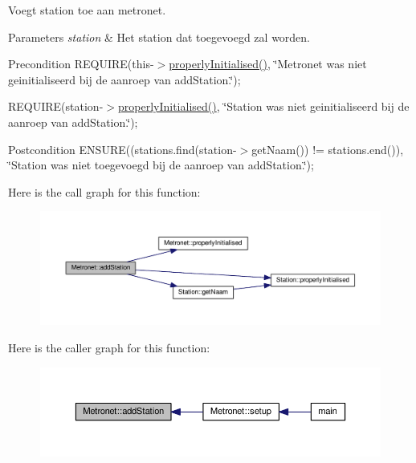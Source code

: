 Voegt station toe aan metronet. 


\begin{DoxyParams}{Parameters}
{\em station} & Het station dat toegevoegd zal worden. \\
\hline
\end{DoxyParams}
\begin{DoxyPrecond}{Precondition}
R\+E\+Q\+U\+I\+RE(this-\/$>$\hyperlink{class_metronet_a3d2adce29a947f162924279b766de645}{properly\+Initialised()}, \char`\"{}\+Metronet was niet geinitialiseerd bij de aanroep van add\+Station.\char`\"{}); 

R\+E\+Q\+U\+I\+RE(station-\/$>$\hyperlink{class_metronet_a3d2adce29a947f162924279b766de645}{properly\+Initialised()}, \char`\"{}\+Station was niet geinitialiseerd bij de aanroep van add\+Station.\char`\"{}); 
\end{DoxyPrecond}
\begin{DoxyPostcond}{Postcondition}
E\+N\+S\+U\+RE((stations.\+find(station-\/$>$get\+Naam()) != stations.\+end()), \char`\"{}\+Station was niet toegevoegd bij de aanroep van add\+Station.\char`\"{}); 
\end{DoxyPostcond}
Here is the call graph for this function\+:\nopagebreak
\begin{figure}[H]
\begin{center}
\leavevmode
\includegraphics[width=350pt]{class_metronet_ac7f4069e577cd4dddb1e166923df3ecb_cgraph}
\end{center}
\end{figure}
Here is the caller graph for this function\+:\nopagebreak
\begin{figure}[H]
\begin{center}
\leavevmode
\includegraphics[width=350pt]{class_metronet_ac7f4069e577cd4dddb1e166923df3ecb_icgraph}
\end{center}
\end{figure}
\mbox{\label{class_metronet_a3a01132772f4a367d83af40a3c02e224}} 
